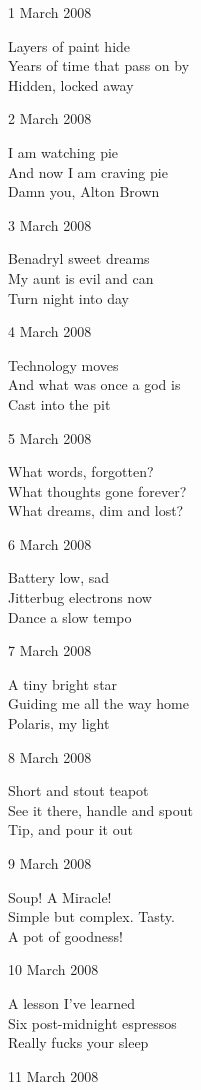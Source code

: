 \documentclass[12pt]{article}
\begin{document}
1 March 2008

Layers of paint hide \\
Years of time that pass on by \\
Hidden, locked away

2 March 2008

I am watching pie \\
And now I am craving pie \\
Damn you, Alton Brown

3 March 2008 

Benadryl sweet dreams \\
My aunt is evil and can \\
Turn night into day

\newpage

4 March 2008

Technology moves \\
And what was once a god is \\
Cast into the pit

5 March 2008

What words, forgotten? \\
What thoughts gone forever? \\
What dreams, dim and lost?

6 March 2008

Battery low, sad \\
Jitterbug electrons now \\
Dance a slow tempo

7 March 2008

A tiny bright star \\
Guiding me all the way home \\
Polaris, my light

8 March 2008

Short and stout teapot \\
See it there, handle and spout \\
Tip, and pour it out

9 March 2008

Soup! A Miracle! \\
Simple but complex. Tasty. \\
A pot of goodness!

10 March 2008

A lesson I've learned \\
Six post-midnight espressos \\
Really fucks your sleep

\newpage

11 March 2008
\end{document}
